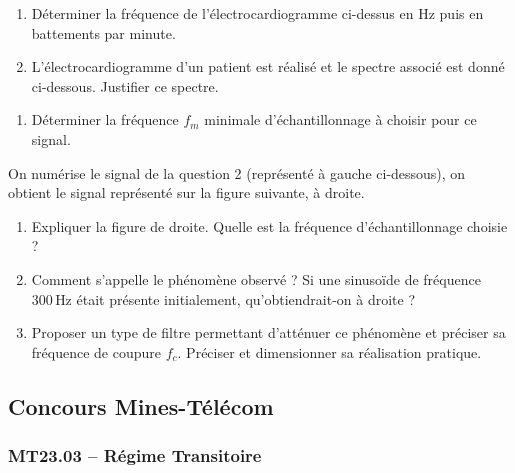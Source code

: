 \begin{enumerate}
    \item Déterminer la fréquence de l'électrocardiogramme ci-dessus en Hz puis en battements par minute.
    \item L'électrocardiogramme d'un patient est réalisé et le spectre associé est donné ci-dessous. Justifier ce spectre.
\end{enumerate}

\begin{center}
\end{center}

\begin{enumerate}[resume]
    \item Déterminer la fréquence $f_m$ minimale d'échantillonnage à choisir pour ce signal.
\end{enumerate}

On numérise le signal de la question 2 (représenté à gauche ci-dessous), on obtient le signal représenté sur la figure suivante, à droite.

\begin{center}
\end{center}

\begin{enumerate}[resume]
    \item Expliquer la figure de droite. Quelle est la fréquence d'échantillonnage choisie ?
    \item Comment s'appelle le phénomène observé ? Si une sinusoïde de fréquence $300\, \text{Hz}$ était présente initialement, qu'obtiendrait-on à droite ?
    \item Proposer un type de filtre permettant d'atténuer ce phénomène et préciser sa fréquence de coupure $f_c$. Préciser et dimensionner sa réalisation pratique.
\end{enumerate}

\newpage
\subsection*{Concours Mines-Télécom}
\subsubsection*{MT23.03 -- Régime Transitoire }

